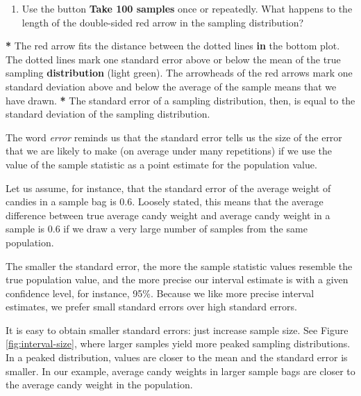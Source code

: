 \documentclass[a4paper]{book}
\newenvironment{Shaded}{\begin{snugshade}}{\end{snugshade}}
\newcommand{\KeywordTok}[1]{\textcolor[rgb]{0,0,0}{\textbf{#1}}}
\newcommand{\StringTok}[1]{\textcolor[rgb]{0.00,0.00,0.00}{#1}}
\newcommand{\ControlFlowTok}[1]{\textcolor[rgb]{0.00,0.00,0.00}{\textbf{#1}}}
\newcommand{\OperatorTok}[1]{\textcolor[rgb]{0.00,0.00,0.00}{\textbf{#1}}}
\newcommand{\NormalTok}[1]{#1}
\providecommand{\tightlist}{%
  \setlength{\itemsep}{0pt}\setlength{\parskip}{0pt}}
\theoremstyle{definition}
\theoremstyle{definition}
\theoremstyle{definition}
\theoremstyle{remark}
\begin{document}
\begin{enumerate}
\def\labelenumi{\arabic{enumi}.}
\setcounter{enumi}{2}
\tightlist
\item
  Use the button \textbf{Take 100 samples} once or repeatedly. What
  happens to the length of the double-sided red arrow in the sampling
  distribution?
\end{enumerate}

\begin{Shaded}
\begin{Highlighting}[]
\OperatorTok{*}\StringTok{ }\NormalTok{The red arrow fits the distance between the dotted lines }\ControlFlowTok{in}\NormalTok{ the bottom plot.}
\NormalTok{The dotted lines mark one standard error above or below the mean of the true}
\NormalTok{sampling }\KeywordTok{distribution}\NormalTok{ (light green). The arrowheads of the red arrows mark one}
\NormalTok{standard deviation above and below the average of the sample means that we}
\NormalTok{have drawn.}
\OperatorTok{*}\StringTok{ }\NormalTok{The standard error of a sampling distribution, then, is equal to the}
\NormalTok{standard deviation of the sampling distribution.}
\end{Highlighting}
\end{Shaded}

The word \emph{error} reminds us that the standard error tells us the
size of the error that we are likely to make (on average under many
repetitions) if we use the value of the sample statistic as a point
estimate for the population value.

Let us assume, for instance, that the standard error of the average
weight of candies in a sample bag is 0.6. Loosely stated, this means
that the average difference between true average candy weight and
average candy weight in a sample is 0.6 if we draw a very large number
of samples from the same population.

The smaller the standard error, the more the sample statistic values
resemble the true population value, and the more precise our interval
estimate is with a given confidence level, for instance, 95\%. Because
we like more precise interval estimates, we prefer small standard errors
over high standard errors.

It is easy to obtain smaller standard errors: just increase sample size.
See Figure \ref{fig:interval-size}, where larger samples yield more
peaked sampling distributions. In a peaked distribution, values are
closer to the mean and the standard error is smaller. In our example,
average candy weights in larger sample bags are closer to the average
candy weight in the population.
\end{document}

